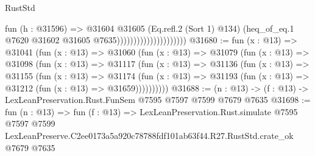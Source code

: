 \begin{lexlean}{RustStd}
\begin{coremodule}
                                          fun (h : @31596) =>
                                          @31604
                                            @31605
                                            (Eq.refl.{2} (Sort 1) @134)
                                            (heq_of_eq.{1}
                                              @7620
                                              @31602
                                              @31605
                                              @7635)))))))))))))))))))))
@31680 := fun (x : @13) =>
  @31041
    (fun (x : @13) =>
    @31060
      (fun (x : @13) =>
      @31079
        (fun (x : @13) =>
        @31098
          (fun (x : @13) =>
          @31117
            (fun (x : @13) =>
            @31136
              (fun (x : @13) =>
              @31155
                (fun (x : @13) =>
                @31174
                  (fun (x : @13) =>
                  @31193 (fun (x : @13) => @31212 (fun (x : @13) => @31659))))))))))
@31688 := (n : @13) -> (f : @13) -> LexLeanPreservation.Rust.FunSem @7595 @7597 @7599 @7679 @7635
@31698 := fun (n : @13) =>
  fun (f : @13) =>
  LexLeanPreservation.Rust.simulate
    @7595
    @7597
    @7599
    LexLeanPreserve.C2ee0173a5a920c78788fdf101ab63f44.R27.RustStd.crate_ok
    @7679
    @7635
\end{coremodule}
\end{lexlean}
